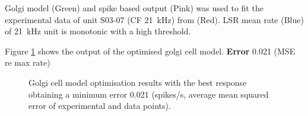 Golgi model (Green) and spike based output (Pink) was used to
fit the experimental data of unit S03-07 (CF 21~kHz) from
\citep{GhoshalKim:1996} (Red).  LSR mean rate (Blue) of 21~kHz unit is
monotonic with a high threshold.

Figure \ref{fig:GolgiResult} shows the output of the optimised golgi cell model.
\textbf{Error} 0.021 (MSE re max rate)


\begin{figure}[htb]
  \centering %
  \caption{Golgi cell model optimisation results with the best response obtaining a minimum error 0.021 (spikes/s, average mean squared error of experimental and data points). }\label{fig:GolgiResult}
\end{figure}










